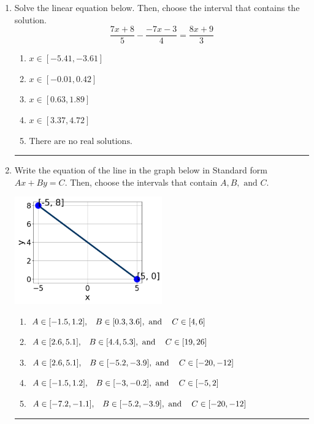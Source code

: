 \documentclass[14pt]{extbook}
\newcommand{\litem}[1]{\item#1\hspace*{-1cm}\rule{\textwidth}{0.4pt}}
\begin{document}
\begin{enumerate}
{\begin{enumerate}[label=\Alph*.]
\end{enumerate} }
\litem{
Solve the linear equation below. Then, choose the interval that contains the solution.\[ \frac{7x + 8}{5} - \frac{-7x -3}{4} = \frac{8x + 9}{3} \]\begin{enumerate}[label=\Alph*.]
\item \( x \in [-5.41, -3.61] \)
\item \( x \in [-0.01, 0.42] \)
\item \( x \in [0.63, 1.89] \)
\item \( x \in [3.37, 4.72] \)
\item \( \text{There are no real solutions.} \)

\end{enumerate} }
\litem{
Write the equation of the line in the graph below in Standard form $Ax+By=C$. Then, choose the intervals that contain $A, B, \text{ and } C$.
\begin{center}
    \includegraphics[width=0.5\textwidth]{../Figures/linearGraphToStandardC.png}
\end{center}
\begin{enumerate}[label=\Alph*.]
\item \( A \in [-1.5, 1.2], \hspace{3mm} B \in [0.3, 3.6], \text{ and } \hspace{3mm} C \in [4, 6] \)
\item \( A \in [2.6, 5.1], \hspace{3mm} B \in [4.4, 5.3], \text{ and } \hspace{3mm} C \in [19, 26] \)
\item \( A \in [2.6, 5.1], \hspace{3mm} B \in [-5.2, -3.9], \text{ and } \hspace{3mm} C \in [-20, -12] \)
\item \( A \in [-1.5, 1.2], \hspace{3mm} B \in [-3, -0.2], \text{ and } \hspace{3mm} C \in [-5, 2] \)
\item \( A \in [-7.2, -1.1], \hspace{3mm} B \in [-5.2, -3.9], \text{ and } \hspace{3mm} C \in [-20, -12] \)


\end{enumerate}}
\end{enumerate}
\end{document}
